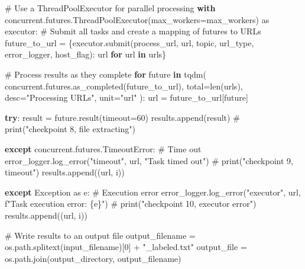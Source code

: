 \documentclass[
  titlepage]{article}
\newenvironment{Shaded}{\begin{snugshade}}{\end{snugshade}}
\newcommand{\BuiltInTok}[1]{\textcolor[rgb]{0.00,0.23,0.31}{#1}}
\newcommand{\CommentTok}[1]{\textcolor[rgb]{0.37,0.37,0.37}{#1}}
\newcommand{\ControlFlowTok}[1]{\textcolor[rgb]{0.00,0.23,0.31}{\textbf{#1}}}
\newcommand{\DecValTok}[1]{\textcolor[rgb]{0.68,0.00,0.00}{#1}}
\newcommand{\ImportTok}[1]{\textcolor[rgb]{0.00,0.46,0.62}{#1}}
\newcommand{\KeywordTok}[1]{\textcolor[rgb]{0.00,0.23,0.31}{\textbf{#1}}}
\newcommand{\NormalTok}[1]{\textcolor[rgb]{0.00,0.23,0.31}{#1}}
\newcommand{\OperatorTok}[1]{\textcolor[rgb]{0.37,0.37,0.37}{#1}}
\newcommand{\PreprocessorTok}[1]{\textcolor[rgb]{0.68,0.00,0.00}{#1}}
\newcommand{\SpecialCharTok}[1]{\textcolor[rgb]{0.37,0.37,0.37}{#1}}
\newcommand{\SpecialStringTok}[1]{\textcolor[rgb]{0.13,0.47,0.30}{#1}}
\newcommand{\StringTok}[1]{\textcolor[rgb]{0.13,0.47,0.30}{#1}}
\begin{document}
\begin{Shaded}
\begin{Highlighting}[]
    \CommentTok{\# Use a ThreadPoolExecutor for parallel processing}
    \ControlFlowTok{with}\NormalTok{ concurrent.futures.ThreadPoolExecutor(max\_workers}\OperatorTok{=}\NormalTok{max\_workers) }\ImportTok{as}\NormalTok{ executor:}
        \CommentTok{\# Submit all tasks and create a mapping of futures to URLs}
\NormalTok{        future\_to\_url }\OperatorTok{=}\NormalTok{ \{executor.submit(process\_url, url, topic, url\_type, error\_logger, host\_flag): url }\ControlFlowTok{for}\NormalTok{ url }\KeywordTok{in}\NormalTok{ urls\}}
        
        \CommentTok{\# Process results as they complete}
        \ControlFlowTok{for}\NormalTok{ future }\KeywordTok{in}\NormalTok{ tqdm(}
\NormalTok{            concurrent.futures.as\_completed(future\_to\_url),}
\NormalTok{            total}\OperatorTok{=}\BuiltInTok{len}\NormalTok{(urls),}
\NormalTok{            desc}\OperatorTok{=}\StringTok{"Processing URLs"}\NormalTok{,}
\NormalTok{            unit}\OperatorTok{=}\StringTok{"url"}
\NormalTok{        ):}
\NormalTok{            url }\OperatorTok{=}\NormalTok{ future\_to\_url[future]}

            \ControlFlowTok{try}\NormalTok{:}
\NormalTok{                result }\OperatorTok{=}\NormalTok{ future.result(timeout}\OperatorTok{=}\DecValTok{60}\NormalTok{)}
\NormalTok{                results.append(result)}
                \CommentTok{\# print("checkpoint 8, file extracting")}

            \ControlFlowTok{except}\NormalTok{ concurrent.futures.}\PreprocessorTok{TimeoutError}\NormalTok{: }\CommentTok{\# Time out}
\NormalTok{                error\_logger.log\_error(}\StringTok{"timeout"}\NormalTok{, url, }\StringTok{"Task timed out"}\NormalTok{)}
                \CommentTok{\# print("checkpoint 9, timeout")}
\NormalTok{                results.append((url, }\StringTok{\textquotesingle{}i\textquotesingle{}}\NormalTok{))}

            \ControlFlowTok{except} \PreprocessorTok{Exception} \ImportTok{as}\NormalTok{ e: }\CommentTok{\# Execution error}
\NormalTok{                error\_logger.log\_error(}\StringTok{"executor"}\NormalTok{, url, }\SpecialStringTok{f"Task execution error: }\SpecialCharTok{\{}\NormalTok{e}\SpecialCharTok{\}}\SpecialStringTok{"}\NormalTok{)}
                \CommentTok{\# print("checkpoint 10, executor error")}
\NormalTok{                results.append((url, }\StringTok{\textquotesingle{}i\textquotesingle{}}\NormalTok{))}
    
    \CommentTok{\# Write results to an output file}
\NormalTok{    output\_filename }\OperatorTok{=}\NormalTok{ os.path.splitext(input\_filename)[}\DecValTok{0}\NormalTok{] }\OperatorTok{+} \StringTok{"\_labeled.txt"}
\NormalTok{    output\_file }\OperatorTok{=}\NormalTok{ os.path.join(output\_directory, output\_filename)}


\end{Highlighting}
\end{Shaded}
\end{document}

